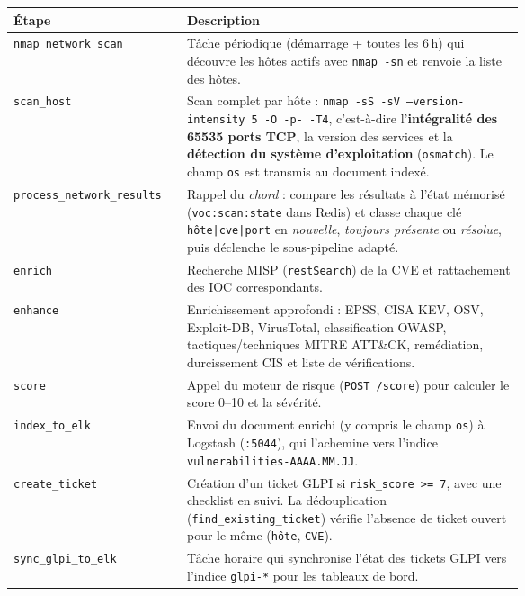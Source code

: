 \begin{center}
\small
\begin{longtable}{@{}l >{\raggedright\arraybackslash}p{0.66\linewidth}@{}}
\toprule
\textbf{\'Etape} & \textbf{Description} \\
\midrule
\endhead
\bottomrule
\endlastfoot
\texttt{nmap\_network\_scan} & T\^ache p\'eriodique (d\'emarrage + toutes les
6\,h) qui d\'ecouvre les h\^otes actifs avec \texttt{nmap -sn} et renvoie la
liste des h\^otes. \\
\texttt{scan\_host} & Scan complet par h\^ote : \texttt{nmap -sS -sV
--version-intensity 5 -O -p- -T4}, c'est-\`a-dire l'\textbf{int\'egralit\'e
des 65535 ports TCP}, la version des services et la \textbf{d\'etection du
syst\`eme d'exploitation} (\texttt{osmatch}). Le champ \texttt{os} est
transmis au document index\'e. \\
\texttt{process\_network\_results} & Rappel du \emph{chord} : compare les
r\'esultats \`a l'\'etat m\'emoris\'e (\texttt{voc:scan:state} dans Redis) et
classe chaque cl\'e \texttt{h\^ote|cve|port} en \emph{nouvelle},
\emph{toujours pr\'esente} ou \emph{r\'esolue}, puis d\'eclenche le
sous-pipeline adapt\'e. \\
\texttt{enrich} & Recherche MISP (\texttt{restSearch}) de la CVE et
rattachement des IOC correspondants. \\
\texttt{enhance} & Enrichissement approfondi : EPSS, CISA KEV, OSV,
Exploit-DB, VirusTotal, classification OWASP, tactiques/techniques MITRE
ATT\&CK, rem\'ediation, durcissement CIS et liste de v\'erifications. \\
\texttt{score} & Appel du moteur de risque (\texttt{POST /score}) pour
calculer le score 0--10 et la s\'ev\'erit\'e. \\
\texttt{index\_to\_elk} & Envoi du document enrichi (y compris le champ
\texttt{os}) \`a Logstash (\texttt{:5044}), qui l'achemine vers l'indice
\texttt{vulnerabilities-AAAA.MM.JJ}. \\
\texttt{create\_ticket} & Cr\'eation d'un ticket GLPI si
\texttt{risk\_score >= 7}, avec une checklist en suivi. La d\'edouplication
(\texttt{find\_existing\_ticket}) v\'erifie l'absence de ticket ouvert pour
le m\^eme (\texttt{h\^ote}, \texttt{CVE}). \\
\texttt{sync\_glpi\_to\_elk} & T\^ache horaire qui synchronise l'\'etat des
tickets GLPI vers l'indice \texttt{glpi-*} pour les tableaux de bord. \\
\bottomrule
\end{longtable}
\end{center}

